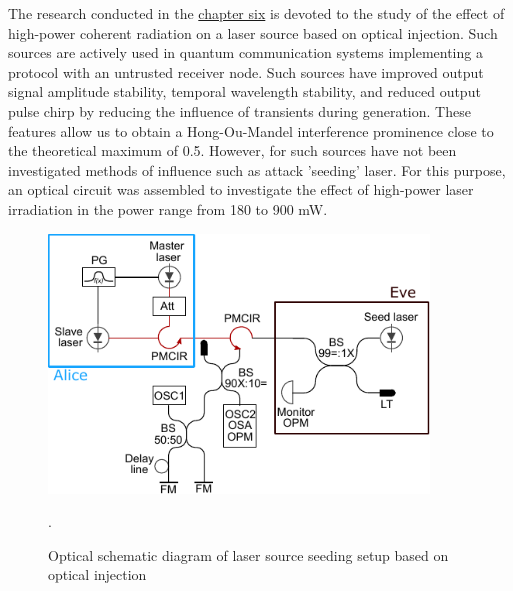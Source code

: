 \newpage The research conducted in the \underline{chapter six} is devoted to the study of the effect of high-power coherent radiation on a laser source based on optical injection. Such sources are actively used in quantum communication systems implementing a protocol with an untrusted receiver node. Such sources have improved output signal amplitude stability, temporal wavelength stability, and reduced output pulse chirp by reducing the influence of transients during generation. These features allow us to obtain a Hong-Ou-Mandel interference prominence close to the theoretical maximum of 0.5. 
\newline However, for such sources have not been investigated methods of influence such as attack 'seeding' laser. For this purpose, an optical circuit was assembled to investigate the effect of high-power laser irradiation in the power range from 180 to 900 mW. 
\begin{figure}
    \centering
    \includegraphics[width=0.9\textwidth]{images/setup_Faraday_Mirrors_final.pdf}
    \caption{Optical schematic diagram of laser source seeding setup based on optical injection}.
    \label{fig:enter-label}
\end{figure}

